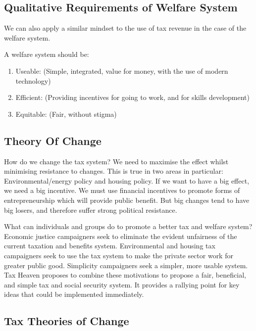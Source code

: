 \documentclass[]{tufte-handout}
\providecommand{\tightlist}{%
  \setlength{\itemsep}{0pt}\setlength{\parskip}{0pt}}
\begin{document}
\hypertarget{qualitative-requirements-of-welfare-system}{%
\subsection{Qualitative Requirements of Welfare
System}\label{qualitative-requirements-of-welfare-system}}

We can also apply a similar mindset to the use of tax revenue in the
case of the welfare system.

A welfare system should be:

\begin{enumerate}
\def\labelenumi{\arabic{enumi}.}
\tightlist
\item
  Useable: (Simple, integrated, value for money, with the use of modern
  technology)
\item
  Efficient: (Providing incentives for going to work, and for skills
  development)
\item
  Equitable: (Fair, without stigma)
\end{enumerate}

\hypertarget{theory-of-change}{%
\subsection{Theory Of Change}\label{theory-of-change}}

How do we change the tax system? We need to maximise the effect whilst
minimising resistance to changes. This is true in two areas in
particular: Environmental/energy policy and housing policy. If we want
to have a big effect, we need a big incentive. We must use financial
incentives to promote forms of entrepreneurship which will provide
public benefit. But big changes tend to have big losers, and therefore
suffer strong political resistance.

What can individuals and groups do to promote a better tax and welfare
system? Economic justice campaigners seek to eliminate the evident
unfairness of the current taxation and benefits system. Environmental
and housing tax campaigners seek to use the tax system to make the
private sector work for greater public good. Simplicity campaigners seek
a simpler, more usable system. Tax Heaven proposes to combine these
motivations to propose a fair, beneficial, and simple tax and social
security system. It provides a rallying point for key ideas that could
be implemented immediately.

\hypertarget{tax-theories-of-change}{%
\subsection{Tax Theories of Change}\label{tax-theories-of-change}}
\end{document}
